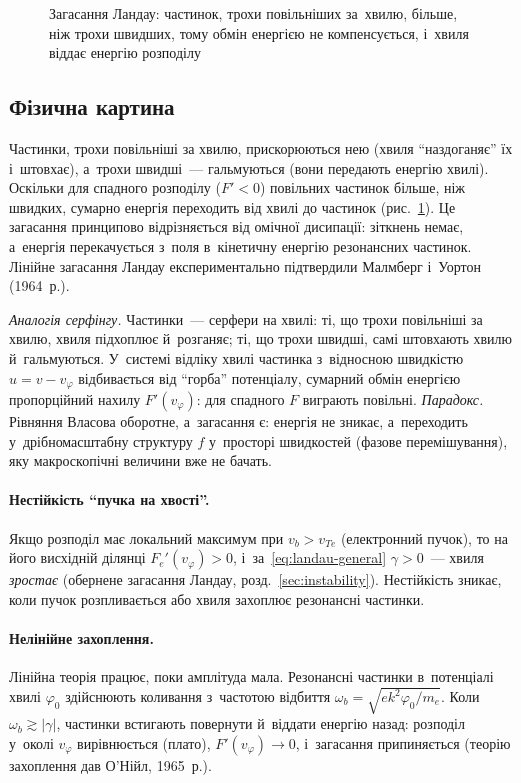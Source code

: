 \begin{figure}[ht]\centering
	\caption{Загасання Ландау: частинок, трохи повільніших за~хвилю, більше, ніж трохи
	швидших, тому обмін енергією не компенсується, і~хвиля віддає енергію розподілу}
	\label{pic:landau}
\end{figure}

\subsection*{Фізична картина}
Частинки, трохи повільніші за хвилю, прискорюються нею (хвиля \enquote{наздоганяє} їх і~штовхає),
а~трохи швидші~--- гальмуються (вони передають енергію хвилі). Оскільки для спадного
розподілу ($F'<0$) повільних частинок більше, ніж швидких, сумарно енергія переходить
від хвилі до частинок (рис.~\ref{pic:landau}). Це загасання принципово відрізняється від
омічної дисипації: зіткнень немає, а~енергія перекачується з~поля в~кінетичну енергію
резонансних частинок. Лінійне загасання Ландау експериментально підтвердили Малмберг і~Уортон (1964~р.).

\emph{Аналогія серфінгу.} Частинки~--- серфери на хвилі: ті, що трохи повільніші за хвилю, хвиля підхоплює й~розганяє;
ті, що трохи швидші, самі штовхають хвилю й~гальмуються. У~системі відліку хвилі частинка з~відносною швидкістю $u=v-v_\varphi$
відбивається від \enquote{горба} потенціалу, сумарний обмін енергією пропорційний нахилу $F'(v_\varphi)$: для спадного $F$ виграють повільні.
\emph{Парадокс.} Рівняння Власова оборотне, а~загасання є: енергія не зникає, а~переходить у~дрібномасштабну структуру $f$ у~просторі швидкостей
(фазове перемішування), яку макроскопічні величини вже не бачать.

\paragraph{Нестійкість \enquote{пучка на хвості}.}
Якщо розподіл має локальний максимум при $v_b>v_{Te}$ (електронний пучок), то на
його висхідній ділянці $F_e'(v_\varphi)>0$, і~за~\eqref{eq:landau-general} $\gamma>0$~---
хвиля \emph{зростає} (обернене загасання Ландау, розд.~\ref{sec:instability}). Нестійкість
зникає, коли пучок розпливається або хвиля захоплює резонансні частинки.

\paragraph{Нелінійне захоплення.}
Лінійна теорія працює, поки амплітуда мала. Резонансні частинки в~потенціалі хвилі
$\varphi_0$ здійснюють коливання з~частотою відбиття $\omega_b=\sqrt{ek^2\varphi_0/m_e}$.
Коли $\omega_b\gtrsim|\gamma|$, частинки встигають повернути й~віддати енергію назад:
розподіл у~околі $v_\varphi$ вирівнюється (плато), $F'(v_\varphi)\to0$, і~загасання
припиняється (теорію захоплення дав О'Нійл, 1965~р.).

